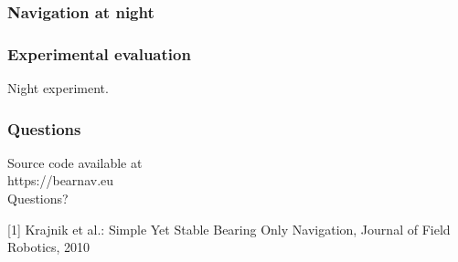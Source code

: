 \begin{frame}
\frametitle{Navigation at night}
\end{frame}

\begin{frame}
	\frametitle{Experimental evaluation}
	\begin{center}
		Night  experiment.
	\end{center}
\end{frame}

\begin{frame}
	\frametitle{Questions}
	\begin{center}
\vfill
\vfill
	Source code available at \\
\vfill
		https://bearnav.eu\\
\vfill
		Questions? 
\vfill
\vfill
\vfill
\vfill
\vfill
	\end{center}
\end{frame}







\tiny{[1] Krajnik et al.: Simple Yet Stable Bearing Only Navigation, Journal of Field Robotics, 2010}


